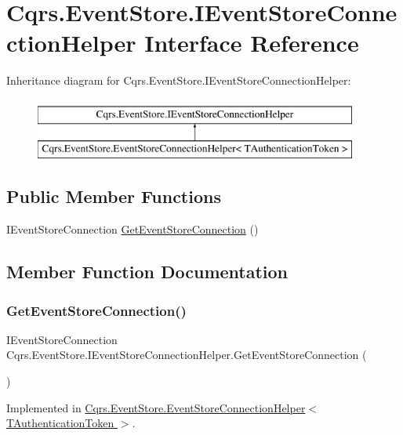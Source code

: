 \hypertarget{interfaceCqrs_1_1EventStore_1_1IEventStoreConnectionHelper}{}\section{Cqrs.\+Event\+Store.\+I\+Event\+Store\+Connection\+Helper Interface Reference}
\label{interfaceCqrs_1_1EventStore_1_1IEventStoreConnectionHelper}
Inheritance diagram for Cqrs.\+Event\+Store.\+I\+Event\+Store\+Connection\+Helper\+:\begin{figure}[H]
\begin{center}
\leavevmode
\includegraphics[height=2.000000cm]{interfaceCqrs_1_1EventStore_1_1IEventStoreConnectionHelper}
\end{center}
\end{figure}
\subsection*{Public Member Functions}
\begin{DoxyCompactItemize}
\item 
I\+Event\+Store\+Connection \hyperlink{interfaceCqrs_1_1EventStore_1_1IEventStoreConnectionHelper_a7efd07573a65ace6d520d3efdb5799f3}{Get\+Event\+Store\+Connection} ()
\end{DoxyCompactItemize}


\subsection{Member Function Documentation}
\mbox{\label{interfaceCqrs_1_1EventStore_1_1IEventStoreConnectionHelper_a7efd07573a65ace6d520d3efdb5799f3}} 
\subsubsection{\texorpdfstring{Get\+Event\+Store\+Connection()}{GetEventStoreConnection()}}
{\footnotesize\ttfamily I\+Event\+Store\+Connection Cqrs.\+Event\+Store.\+I\+Event\+Store\+Connection\+Helper.\+Get\+Event\+Store\+Connection (\begin{DoxyParamCaption}{ }\end{DoxyParamCaption})}



Implemented in \hyperlink{classCqrs_1_1EventStore_1_1EventStoreConnectionHelper_a36c7ef0505319af9f8ae02da0050ab30}{Cqrs.\+Event\+Store.\+Event\+Store\+Connection\+Helper$<$ T\+Authentication\+Token $>$}.

